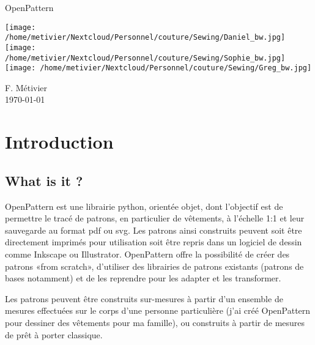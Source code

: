 \documentclass[10pt,a4paper,twoside]{report}
\begin{document}
\begin{titlepage}
\vspace*{5cm}
\begin{flushright}
{\Huge\sf OpenPattern}
\vspace*{1cm}

\begin{center}
\texttt{[image: /home/metivier/Nextcloud/Personnel/couture/Sewing/Daniel\_bw.jpg]}
\texttt{[image: /home/metivier/Nextcloud/Personnel/couture/Sewing/Sophie\_bw.jpg]}
\texttt{[image: /home/metivier/Nextcloud/Personnel/couture/Sewing/Greg\_bw.jpg]}
\end{center}

\vspace*{1cm}
{\Large\sf F. Métivier}\\
\vspace*{1cm}
{\sf\today}
\end{flushright}


\end{titlepage}
\pagestyle{headings}
\tableofcontents


\chapter{Introduction}

\section{What is it ?}

OpenPattern  est une librairie python, orientée objet,  dont l'objectif est de permettre le tracé de patrons, en particulier de vêtements, à l'échelle 1:1 et leur sauvegarde au format pdf ou svg. Les patrons ainsi construits peuvent soit être directement imprimés pour utilisation soit être repris dans un logiciel de dessin comme Inkscape ou Illustrator.
OpenPattern offre la possibilité de créer des patrons «from scratch», d'utiliser des librairies de patrons existants (patrons de bases notamment) et de les reprendre pour les adapter et les transformer.

Les patrons peuvent être construits sur-mesures à partir d'un ensemble de mesures effectuées sur le corps d'une personne particulière (j'ai créé OpenPattern pour dessiner des vêtements pour ma famille), ou construits à partir de mesures de prêt à porter classique.
\end{document}
